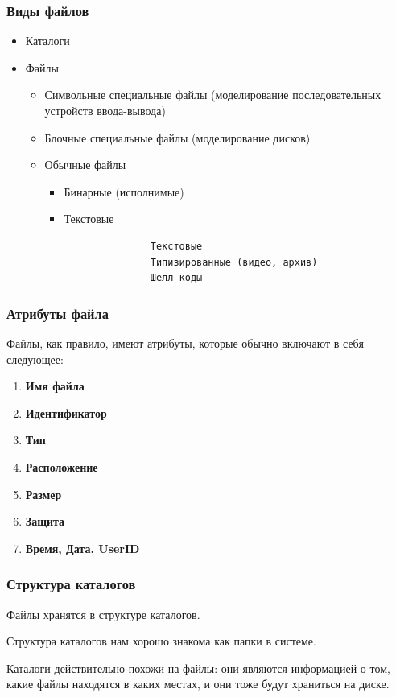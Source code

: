 \begin{frame}[fragile]
\frametitle{Виды файлов}
\begin{itemize}
\item{Каталоги}
\item{Файлы
  \begin{itemize}
    \item{Символьные специальные файлы (моделирование последовательных устройств ввода-вывода)}
    \item{Блочные специальные файлы (моделирование дисков)}
		 \item{Обычные файлы
		  \begin{itemize}
			\item{Бинарные (исполнимые)}
			\item{Текстовые
			\begin{verbatim}
			   Текстовые
			   Типизированные (видео, архив)
			   Шелл-коды
			\end{verbatim}
			}
			\end{itemize}
		}
\end{itemize}

}
\end{itemize}
\end{frame}

\begin{frame}
\frametitle{Атрибуты файла}

Файлы, как правило, имеют атрибуты, которые обычно включают в себя следующее:

\begin{enumerate}
	\item \textbf{Имя файла}
	\item \textbf{Идентификатор}
	\item \textbf{Тип}
	\item \textbf{Расположение}
	\item \textbf{Размер}
	\item \textbf{Защита}
	\item \textbf{Время, Дата, UserID}
\end{enumerate}


\end{frame}

\begin{frame}
\frametitle{Структура каталогов}

Файлы хранятся в структуре каталогов.

Структура каталогов нам хорошо знакома как папки в системе.

Каталоги действительно похожи на файлы: они являются информацией о том, какие файлы находятся в каких местах, и они тоже будут храниться на диске.

\end{frame}


